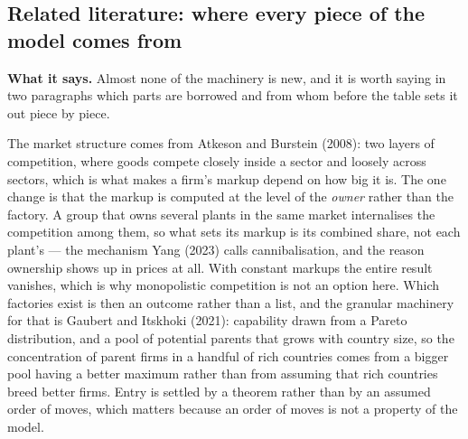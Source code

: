 \documentclass[11pt]{article}
\newcommand{\says}[1]{\smallskip\noindent\textbf{What it says.} #1\smallskip}
\theoremstyle{plain}
\theoremstyle{remark}
\theoremstyle{definition}
\begin{document}
\subsection{Related literature: where every piece of the model comes from}
\label{sec:provenance}

\says{Almost none of the machinery is new, and it is worth saying in two paragraphs
which parts are borrowed and from whom before the table sets it out piece by piece.}

The market structure comes from Atkeson and Burstein (2008): two layers of competition,
where goods compete closely inside a sector and loosely across sectors, which is what
makes a firm's markup depend on how big it is. The one change is that the markup is
computed at the level of the \emph{owner} rather than the factory. A group that owns
several plants in the same market internalises the competition among them, so what sets
its markup is its combined share, not each plant's --- the mechanism Yang (2023) calls
cannibalisation, and the reason ownership shows up in prices at all. With constant
markups the entire result vanishes, which is why monopolistic competition is not an
option here. Which factories exist is then an outcome rather than a list, and the
granular machinery for that is Gaubert and Itskhoki (2021): capability drawn from a
Pareto distribution, and a pool of potential parents that grows with country size, so
the concentration of parent firms in a handful of rich countries comes from a bigger
pool having a better maximum rather than from assuming that rich countries breed better
firms. Entry is settled by a theorem rather than by an assumed order of moves, which
matters because an order of moves is not a property of the model.
\end{document}

